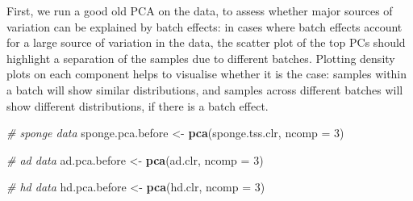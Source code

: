 \documentclass[]{book}
\newenvironment{Shaded}{\begin{snugshade}}{\end{snugshade}}
\newcommand{\KeywordTok}[1]{\textcolor[rgb]{0.13,0.29,0.53}{\textbf{#1}}}
\newcommand{\DataTypeTok}[1]{\textcolor[rgb]{0.13,0.29,0.53}{#1}}
\newcommand{\DecValTok}[1]{\textcolor[rgb]{0.00,0.00,0.81}{#1}}
\newcommand{\FloatTok}[1]{\textcolor[rgb]{0.00,0.00,0.81}{#1}}
\newcommand{\StringTok}[1]{\textcolor[rgb]{0.31,0.60,0.02}{#1}}
\newcommand{\CommentTok}[1]{\textcolor[rgb]{0.56,0.35,0.01}{\textit{#1}}}
\newcommand{\OperatorTok}[1]{\textcolor[rgb]{0.81,0.36,0.00}{\textbf{#1}}}
\newcommand{\NormalTok}[1]{#1}
\begin{document}
First, we run a good old PCA on the data, to assess whether major
sources of variation can be explained by batch effects: in cases where
batch effects account for a large source of variation in the data, the
scatter plot of the top PCs should highlight a separation of the samples
due to different batches. Plotting density plots on each component helps
to visualise whether it is the case: samples within a batch will show
similar distributions, and samples across different batches will show
different distributions, if there is a batch effect.

\begin{Shaded}
\begin{Highlighting}[]
\CommentTok{# sponge data}
\NormalTok{sponge.pca.before <-}\StringTok{ }\KeywordTok{pca}\NormalTok{(sponge.tss.clr, }\DataTypeTok{ncomp =} \DecValTok{3}\NormalTok{)}

\CommentTok{# ad data}
\NormalTok{ad.pca.before <-}\StringTok{ }\KeywordTok{pca}\NormalTok{(ad.clr, }\DataTypeTok{ncomp =} \DecValTok{3}\NormalTok{)}

\CommentTok{# hd data}
\NormalTok{hd.pca.before <-}\StringTok{ }\KeywordTok{pca}\NormalTok{(hd.clr, }\DataTypeTok{ncomp =} \DecValTok{3}\NormalTok{)}
\end{Highlighting}
\end{Shaded}

\begin{Shaded}
\end{Shaded}
\end{document}
